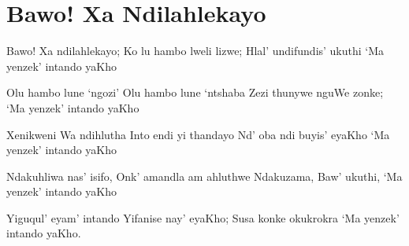 \starttocol
\chapter{Bawo! Xa Ndilahlekayo}
\nexttocol
\hfill{\it }
\stoptocol
\starttocol
\startlines
{\sc Bawo!} Xa ndilahlekayo;
Ko lu hambo lweli lizwe;
Hlal' undifundis' ukuthi
`Ma yenzek' intando yaKho

Olu hambo lune `ngozi'
Olu hambo lune `ntshaba
Zezi thunywe nguWe zonke;
`Ma yenzek' intando yaKho

Xenikweni Wa ndihlutha
Into endi yi thandayo
Nd' oba ndi buyis' eyaKho
`Ma yenzek' intando yaKho

Ndakuhliwa nas' isifo,
Onk' amandla am ahluthwe
Ndakuzama, Baw' ukuthi,
`Ma yenzek' intando yaKho

Yiguqul' eyam' intando
Yifanise nay' eyaKho;
Susa konke okukrokra
`Ma yenzek' intando yaKho.
\stoplines
\nexttocol

\stoptocol
